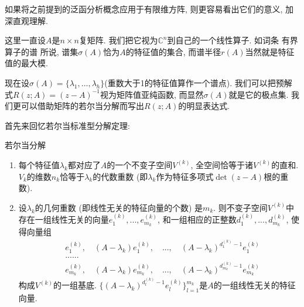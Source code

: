 

如果将之前提到的泛函分析概念应用于有限维方阵, 则更容易看出它们的意义, 加深直观理解. 

这里一直设$A$是$n\times n$复矩阵. 我们把它视为$\mathbb{C}^n$到自己的一个线性算子. 如词条 有界算子的谱 所说, 谱集$\sigma(A)$恰为$A$的特征值的集合, 而谱半径$r(A)$当然就是特征值的最大模. 

现在设$\sigma(A)=\{\lambda_1,...,\lambda_h\}$(重数大于1的特征值算作一个谱点). 我们可以把预解式$R(z;A)=(z-A)^{-1}$视为矩阵值亚纯函数, 而显然$\sigma(A)$就是它的极点集. 我们更可以借助矩阵的若尔当分解而写出$R(z;A)$的明显表达式. 

首先来回忆若尔当标准型分解定理:

\begin{theorem}{若尔当分解}
\begin{enumerate}
\item 每个特征值$\lambda_k$都对应了$A$的一个不变子空间$V^{(k)}$, 全空间恰等于诸$V^{(k)}$的直和. $V_k$的维数$n_k$恰等于$\lambda_k$的代数重数 (即$\lambda_k$作为特征多项式$\det(z-A)$根的重数).
\item 设$\lambda_k$的几何重数 (即线性无关的特征向量的个数) 是$m_k$. 则不变子空间$V^{(k)}$中存在一组线性无关的向量$e^{(k)}_1,...,e^{(k)}_{m_k}$, 和一组相应的正整数$d^{(k)}_1,...,d^{(k)}_{m_k}$, 使得向量组
$$
\begin{aligned}
&e^{(k)}_1,\quad(A-\lambda_k)e^{(k)}_1,\quad...,\quad(A-\lambda_k)^{d^{(k)}_1-1}e^{(k)}_1\\
&......\\
&e^{(k)}_{m_k},\quad(A-\lambda_k)e^{(k)}_{m_k},\quad...,\quad(A-\lambda_k)^{d^{(k)}_{m_k}-1}e^{(k)}_{m_k}
\end{aligned}
$$
构成$V^{(k)}$的一组基底. $\{(A-\lambda_k)^{d^{(k)}_l-1}e^{(k)}_l\}_{l=1}^{m_k}$是$A$的一组线性无关的特征向量.
\end{enumerate}
\end{theorem}

